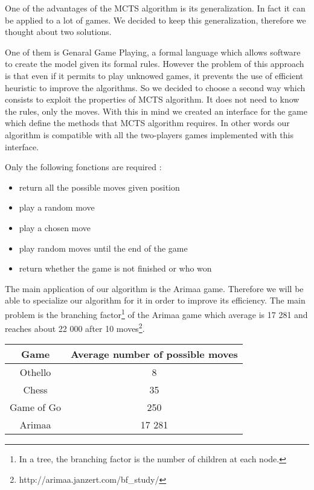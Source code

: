 One of the advantages of the MCTS algorithm is its generalization. In fact it can be applied to a lot of games. We decided to keep this generalization, therefore we thought about two solutions.

One of them is Genaral Game Playing, a formal language which allows software to create the model given its formal rules. However the problem of this approach is that even if it permits to play unknowed games, it prevents the use of efficient heuristic to improve the algorithms.
So we decided to choose a second way which consists to exploit the properties of MCTS algorithm. 
It does not need to know the rules, only the moves. With this in mind we created an interface for the game which define the methods that MCTS algorithm requires. In other words our algorithm is compatible with all the two-players games implemented with this interface.

Only the following fonctions are required : 
\begin{itemize}
\item return all the possible moves given position
\item play a random move
\item play a chosen move 
\item play random moves until the end of the game
\item return whether the game is not finished or who won
\end{itemize}

The main application of our algorithm is the Arimaa game. Therefore we will be able to specialize our algorithm for it in order to improve its efficiency. The main problem is the branching factor\footnote{In a tree, the branching factor is the number of children at each node.} of the Arimaa game which average is 17 281 and reaches about 22 000 after 10 moves\footnote{http://arimaa.janzert.com/bf\_study/}.\\

\begin{center}
	\begin{tabular}{ | c | c |}
		\hline Game & Average number of possible moves \\ \hline
		\hline  
		Othello & 8\\
		\hline  
		Chess & 35\\
		\hline  
		Game of Go & 250\\
		\hline
		Arimaa & 17 281\\
		\hline
	\end{tabular}
\end{center}

